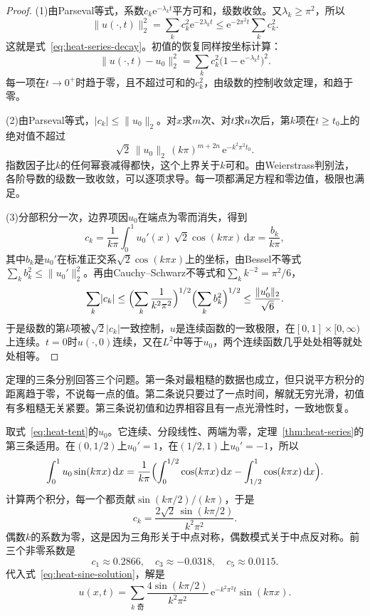 \begin{proof}
(1)由Parseval等式，系数$c_k\mathrm{e}^{-\lambda_kt}$平方可和，级数收敛。又$\lambda_k\geq\pi^2$，所以
\[
 \lVert u(\cdot,t)\rVert_2^2=\sum_kc_k^2\mathrm{e}^{-2\lambda_kt}\leq\mathrm{e}^{-2\pi^2t}\sum_kc_k^2 .
\]
这就是式~\eqref{eq:heat-series-decay}。初值的恢复同样按坐标计算：
\[
 \lVert u(\cdot,t)-u_0\rVert_2^2=\sum_kc_k^2\bigl(1-\mathrm{e}^{-\lambda_kt}\bigr)^2 .
\]
每一项在$t\to0^+$时趋于零，且不超过可和的$c_k^2$，由级数的控制收敛定理，和趋于零。

(2)由Parseval等式，$\lvert c_k\rvert\leq\lVert u_0\rVert_2$。对$x$求$m$次、对$t$求$n$次后，第$k$项在$t\geq t_0$上的绝对值不超过
\[
 \sqrt2\,\lVert u_0\rVert_2\,(k\pi)^{m+2n}\,\mathrm{e}^{-k^2\pi^2t_0} .
\]
指数因子比$k$的任何幂衰减得都快，这个上界关于$k$可和。由Weierstrass判别法，各阶导数的级数一致收敛，可以逐项求导。每一项都满足方程和零边值，极限也满足。

(3)分部积分一次，边界项因$u_0$在端点为零而消失，得到
\[
 c_k=\frac{1}{k\pi}\int_0^1u_0'(x)\,\sqrt2\cos(k\pi x)\,\mathrm{d}x=\frac{b_k}{k\pi},
\]
其中$b_k$是$u_0'$在标准正交系$\sqrt2\cos(k\pi x)$上的坐标，由Bessel不等式$\sum_kb_k^2\leq\lVert u_0'\rVert_2^2$。再由Cauchy--Schwarz不等式和$\sum_kk^{-2}=\pi^2/6$，
\[
 \sum_k\lvert c_k\rvert\leq\Bigl(\sum_k\frac{1}{k^2\pi^2}\Bigr)^{1/2}\Bigl(\sum_kb_k^2\Bigr)^{1/2}\leq\frac{\lVert u_0'\rVert_2}{\sqrt6} .
\]
于是级数的第$k$项被$\sqrt2\lvert c_k\rvert$一致控制，$u$是连续函数的一致极限，在$[0,1]\times[0,\infty)$上连续。$t=0$时$u(\cdot,0)$连续，又在$L^2$中等于$u_0$，两个连续函数几乎处处相等就处处相等。
\end{proof}

定理的三条分别回答三个问题。第一条对最粗糙的数据也成立，但只说平方积分的距离趋于零，不说每一点的值。第二条说只要过了一点时间，解就无穷光滑，初值有多粗糙无关紧要。第三条说初值和边界相容且有一点光滑性时，一致地恢复。

\begin{example}[三角形的系数]
\label{ex:heat-tent-coefficients}
取式~\eqref{eq:heat-tent}的$u_0$。它连续、分段线性、两端为零，定理~\ref{thm:heat-series}的第三条适用。在$(0,1/2)$上$u_0'=1$，在$(1/2,1)$上$u_0'=-1$，所以
\[
 \int_0^1u_0\sin(k\pi x)\,\mathrm{d}x
 =\frac{1}{k\pi}\Bigl(\int_0^{1/2}\cos(k\pi x)\,\mathrm{d}x-\int_{1/2}^1\cos(k\pi x)\,\mathrm{d}x\Bigr) .
\]
计算两个积分，每一个都贡献$\sin(k\pi/2)/(k\pi)$，于是
\[
 c_k=\frac{2\sqrt2\,\sin(k\pi/2)}{k^2\pi^2} .
\]
偶数$k$的系数为零，这是因为三角形关于中点对称，偶数模式关于中点反对称。前三个非零系数是
\[
 c_1\approx0.2866,\quad c_3\approx-0.0318,\quad c_5\approx0.0115 .
\]
代入式~\eqref{eq:heat-sine-solution}，解是
\[
 u(x,t)=\sum_{k\text{ 奇}}\frac{4\sin(k\pi/2)}{k^2\pi^2}\,\mathrm{e}^{-k^2\pi^2t}\sin(k\pi x) .
\]
\end{example}

